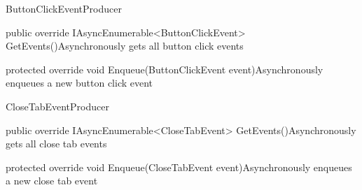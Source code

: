 \begin{class}{ButtonClickEventProducer} 
    


    \begin{methods}
        \begin{method}{public override IAsyncEnumerable<ButtonClickEvent> GetEvents()}{Asynchronously gets all button click events}
        \end{method}
        \begin{method}{ protected override void Enqueue(ButtonClickEvent event)}{Asynchronously enqueues a new button click event}
            \begin{parameters}
            \end{parameters}
        \end{method}
    \end{methods}
\end{class}

\begin{class}{CloseTabEventProducer} 
    


    \begin{methods}
        \begin{method}{public override IAsyncEnumerable<CloseTabEvent> GetEvents()}{Asynchronously gets all close tab events}
        \end{method}
        \begin{method}{protected override void Enqueue(CloseTabEvent event)}{Asynchronously enqueues a new close tab event}
            \begin{parameters}
            \end{parameters}
        \end{method}
    \end{methods}
\end{class}

